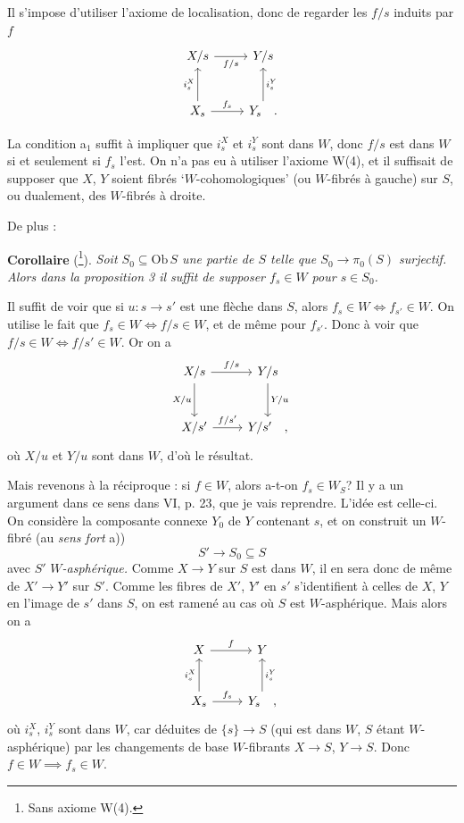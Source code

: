 \documentclass[11pt]{article}
\newcommand{\printedpage}[1]{\marginpar{\footnotesize p.~#1}}
\newcommand{\msp}[1]{\marginpar{\footnotesize [#1]}}
\begin{document}
Il s'impose d'utiliser l'axiome de localisation, donc de regarder les $f/s$ induits par $f$
\printedpage{6}
\[
\begin{tikzcd}[row sep=large]
X/s \arrow[r, "f/s"'] & Y/s \\
X_s \arrow[u, "i_s^X"] \arrow[r, "f_s"] & Y_s \arrow[u, "i_s^Y"'] \quad .
\end{tikzcd}
\]

La condition a$_1$ suffit à impliquer que $i_s^X$ et $i_s^Y$ sont dans $W$, donc $f/s$ est dans $W$ si et seulement si $f_s$ l'est. On n'a pas eu à utiliser l'axiome W(4), et il suffisait de supposer que $X$, $Y$ soient fibrés ‘$W$-cohomologiques’ (ou $W$-fibrés à gauche) sur $S$, ou dualement, des $W$-fibrés à droite.

De plus :

\textbf{Corollaire} (\footnote[9]{Sans axiome W(4).}). \textit{Soit $S_0 \subseteq \mathrm{Ob}\,S$ une partie de $S$ telle que $S_0 \longrightarrow \pi_0(S)$ surjectif. Alors dans la proposition 3 il suffit de supposer $f_s \in W$ pour $s \in S_0$.}

Il suffit de voir que si $u : s \longrightarrow s'$ est une flèche dans $S$, alors $f_s \in W \iff f_{s'} \in W$. On utilise le fait que $f_s \in W \iff f/s \in W$, et de même pour $f_{s'}$. Donc à voir que $f/s \in W \iff f/s' \in W$. Or on a
\[
\begin{tikzcd}[row sep=large]
X/s \arrow[r, "f/s"] \arrow[d, "X/u"'] & Y/s \arrow[d, "Y/u"] \\
X/s' \arrow[r, "f/s'"] & Y/s' \quad ,
\end{tikzcd}
\]
où $X/u$ et $Y/u$ sont dans $W$, d'où le résultat.

Mais revenons à la réciproque : si $f \in W$, alors a-t-on $f_s \in W_S$? Il y a un argument dans ce sens dans VI, p. 23, que je vais reprendre. L'idée est celle-ci. On considère la composante connexe $Y_0$ de $Y$ contenant $s$, et on construit un
\msp{page 7}
$W$-fibré (au \textit{sens fort} a))
\[ S' \longrightarrow S_0 \subseteq S \]
avec $S'$ \textit{$W$-asphérique.} Comme $X \longrightarrow Y$ sur $S$ est dans $W$, il en sera donc de même de $X' \longrightarrow Y'$ sur $S'$. Comme les fibres de $X'$, $Y'$ en $s'$ s'identifient à celles de $X$, $Y$ en l'image de $s'$ dans $S$, on est ramené au cas où $S$ est $W$-asphérique. Mais alors on a
\[
\begin{tikzcd}[row sep=large]
X \arrow[r, "f"] & Y \\
X_s \arrow[u, "i_s^X"] \arrow[r, "f_s"] & Y_s \arrow[u, "i_s^Y"'] \quad ,
\end{tikzcd}
\]
\printedpage{7}
où $i_s^X$, $i_s^Y$ sont dans $W$, car déduites de $\{s\} \longrightarrow S$ (qui est dans $W$, $S$ étant $W$-asphérique) par les changements de base $W$-fibrants $X \longrightarrow S$, $Y \longrightarrow S$. Donc $f \in W \implies f_s \in W$.
\end{document}
